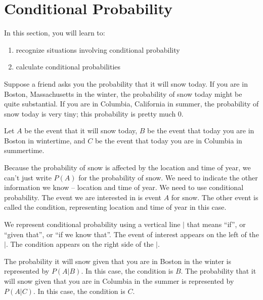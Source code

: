 \section{Conditional Probability}\label{section_conditional_probability}
In this section, you will learn to:
\begin{enumerate}
    \item recognize situations involving conditional probability
    \item calculate conditional probabilities
\end{enumerate}

Suppose a friend asks you the probability that it will snow today. If you are in Boston, Massachusetts in the winter, the probability of snow today might be quite substantial. If you are in Columbia, California in summer, the probability of snow today is very tiny; this probability is pretty much 0.

Let $A$ be the event that it will snow today, $B$ be the event that today you are in Boston in wintertime, and $C$ be the event that today you are in Columbia in summertime.

Because the probability of snow is affected by the location and time of year, we can’t just write $P(A)$ for the probability of snow. We need to indicate the other information we know – location and time of year. We need to use conditional probability. The event we are interested in is event $A$ for snow. The other event is called the condition, representing location and time of year in this case.

We represent conditional probability using a vertical line $|$ that means “if”, or “given that”, or “if we know that”. The event of interest appears on the left of the $|$. The condition appears on the right side of the $|$.

The probability it will snow given that you are in Boston in the winter is represented by $P(A|B)$. In this case, the condition is $B$.
The probability that it will snow given that you are in Columbia in the summer is represented by $P(A|C)$. In this case, the condition is $C$.

